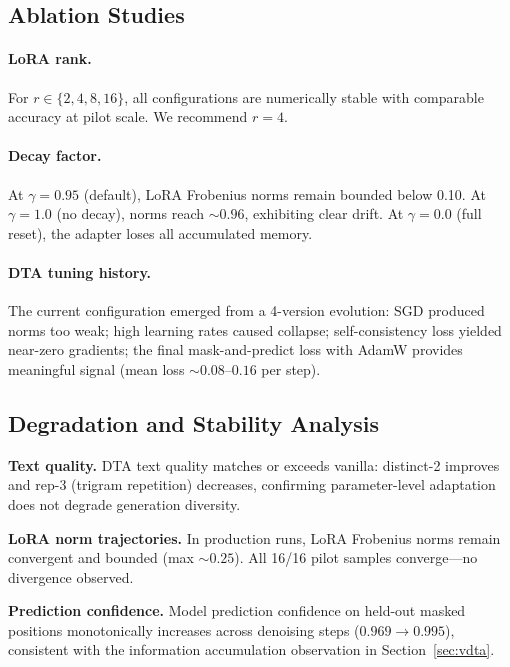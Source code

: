 \documentclass{article}
\begin{document}
\subsection{Ablation Studies}
\label{sec:ablations}

\paragraph{LoRA rank.} For $r \in \{2, 4, 8, 16\}$, all configurations are numerically stable with comparable accuracy at pilot scale. We recommend $r = 4$.

\paragraph{Decay factor.} At $\gamma = 0.95$ (default), LoRA Frobenius norms remain bounded below 0.10. At $\gamma = 1.0$ (no decay), norms reach ${\sim}0.96$, exhibiting clear drift. At $\gamma = 0.0$ (full reset), the adapter loses all accumulated memory.

\paragraph{DTA tuning history.} The current configuration emerged from a 4-version evolution: SGD produced norms too weak; high learning rates caused collapse; self-consistency loss yielded near-zero gradients; the final mask-and-predict loss with AdamW provides meaningful signal (mean loss ${\sim}0.08$--$0.16$ per step).

\subsection{Degradation and Stability Analysis}
\label{sec:degradation}

\textbf{Text quality.} DTA text quality matches or exceeds vanilla: distinct-2 improves and rep-3 (trigram repetition) decreases, confirming parameter-level adaptation does not degrade generation diversity.

\textbf{LoRA norm trajectories.} In production runs, LoRA Frobenius norms remain convergent and bounded (max ${\sim}0.25$). All 16/16 pilot samples converge---no divergence observed.

\textbf{Prediction confidence.} Model prediction confidence on held-out masked positions monotonically increases across denoising steps ($0.969 \to 0.995$), consistent with the information accumulation observation in Section~\ref{sec:vdta}.
\end{document}
